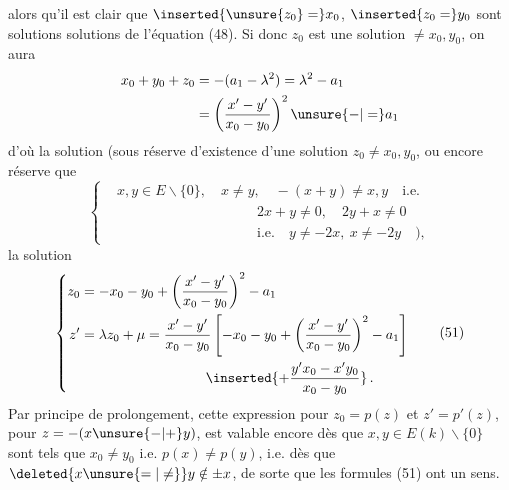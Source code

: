 alors qu'il est clair que $\inserted{\unsure{z_0}=}x_0$, $\inserted{z_0=}y_0$ sont solutions solutions de l'équation (48). Si donc $z_0$ est une solution $\ne x_0,y_0$, on aura
\[
 \begin{aligned}
 x_0+y_0+z_0&=-(a_1-\lambda^2)=\lambda^2-a_1\\
 &=\left(\frac{x'-y'}{x_0-y_0}\right)^2\unsure{-|=}a_1
 \end{aligned}
\]
d'où la solution (sous réserve d'existence d'une solution $z_0\ne x_0,y_0$, ou encore   réserve que
\[
 \left\{\begin{aligned}
 &x,y\in E\smallsetminus\{0\},\quad x\ne y,\quad -(x+y)\ne x,y\quad\text{i.e.}\\
 &\hspace{10em}2x+y\ne0,\quad 2y+x\ne0\\
 &\hspace{10em}\text{i.e.}\quad y\ne-2x,\ x\ne-2y\quad),
 \end{aligned}\right. \tag*{(50)}
\]
la solution
\[
 \left\{\begin{aligned}
 z_0&=-x_0-y_0+\left(\frac{x'-y'}{x_0-y_0}\right)^2-a_1\\
 z'&=\lambda z_0+\mu=\frac{x'-y'}{x_0-y_0}
 \left[-x_0-y_0+\left(\frac{x'-y'}{x_0-y_0}\right)^2-a_1\right]\\
 &\hspace{9em}\inserted{+\frac{y'x_0-x'y_0}{x_0-y_0}}\,.
 \end{aligned}\right. \tag*{(51)}
\]
Par principe de prolongement, cette expression pour $z_0=p(z)$ et $z'=p'(z)$, pour $z=-(x\unsure{-|+}y)$, est valable encore dès que $x,y\in E(k)\smallsetminus\{0\}$ sont tels que $x_0\ne y_0$ i.e. $p(x)\ne p(y)$, i.e. dès que $\deleted{x\unsure{=|\ne}}y\notin\pm x$, de sorte que les formules (51) ont un sens.
